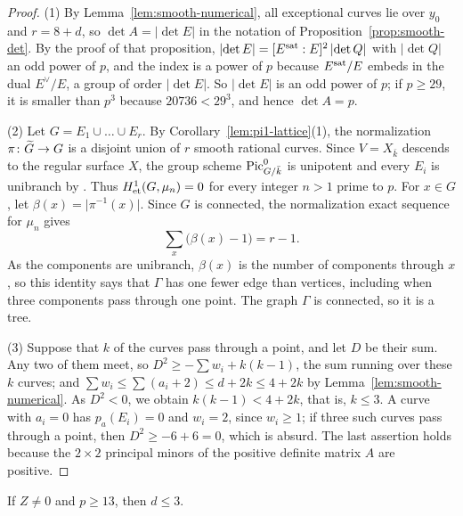 \begin{proof}
(1) By Lemma~\ref{lem:smooth-numerical}, all exceptional curves lie over $y_0$ and $r = 8+d$, so $\det A = \lvert\det E\rvert$ in the notation of Proposition~\ref{prop:smooth-det}.
By the proof of that proposition, $\lvert\det E\rvert = [E^{\rm sat}:E]^2\,\lvert\det Q\rvert$ with $\lvert\det Q\rvert$ an odd power of $p$, and the index is a power of $p$ because $E^{\rm sat}/E$ embeds in the dual $E^\vee/E$, a group of order $\lvert\det E\rvert$.
So $\lvert\det E\rvert$ is an odd power of $p$; if $p\geq 29$, it is smaller than $p^3$ because $20736<29^3$, and hence $\det A = p$.

(2) Let $G = E_1\cup\dots\cup E_r$.
By Corollary~\ref{lem:pi1-lattice}(1), the normalization $\pi\colon\widetilde G\to G$ is a disjoint union of $r$ smooth rational curves.
Since $V = X_{\bar k}$ descends to the regular surface $X$, the group scheme $\operatorname{Pic}^0_{G/\bar k}$ is unipotent and every $E_i$ is unibranch by \cite[Corollaries~2.6 and~2.7]{Sch08}.
Thus $H^1_{\rm et}(G,\mu_n) = 0$ for every integer $n>1$ prime to $p$.
For $x\in G$, let $\beta(x) = \lvert\pi^{-1}(x)\rvert$.
Since $G$ is connected, the normalization exact sequence for $\mu_n$ gives
\[
  \sum_x\bigl(\beta(x)-1\bigr) = r-1.
\]
As the components are unibranch, $\beta(x)$ is the number of components through $x$, so this identity says that $\Gamma$ has one fewer edge than vertices, including when three components pass through one point.
The graph $\Gamma$ is connected, so it is a tree.

(3) Suppose that $k$ of the curves pass through a point, and let $D$ be their sum.
Any two of them meet, so $D^2\geq-\sum w_i+k(k-1)$, the sum running over these $k$ curves; and $\sum w_i\leq\sum(a_i+2)\leq d+2k\leq 4+2k$ by Lemma~\ref{lem:smooth-numerical}.
As $D^2<0$, we obtain $k(k-1)<4+2k$, that is, $k\leq 3$.
A curve with $a_i = 0$ has $p_a(E_i) = 0$ and $w_i = 2$, since $w_i\geq 1$; if three such curves pass through a point, then $D^2\geq -6+6 = 0$, which is absurd.
The last assertion holds because the $2\times 2$ principal minors of the positive definite matrix $A$ are positive.
\end{proof}

\begin{lemma}\label{lem:smooth-tangent}
If $Z\neq 0$ and $p\geq 13$, then $d\leq 3$.
\end{lemma}

